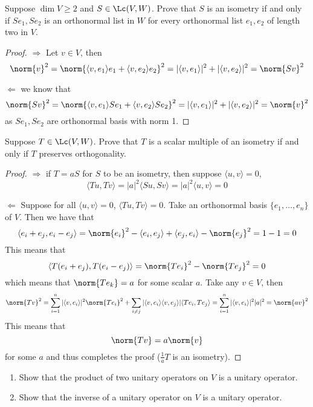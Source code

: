 \documentclass{extarticle}
\begin{document}
\newpage
{}

\begin{problem}{1}
    Suppose \(\dim V \geq 2\) and \(S \in \Lc(V, W)\). Prove that \(S\) is an isometry if
    and only if \(S e_1, S e_2\) is an orthonormal list in \(W\) for every orthonormal
    list \(e_1, e_2\) of length two in \(V\).
\end{problem}

\begin{proof}
\(\Rightarrow\) Let \(v \in V\), then
\[\norm{v}^2 = \norm{\langle v,e_1 \rangle e_1  + \langle v,e_2 \rangle e_2}^2 =  |
\langle v,e_1 \rangle|^2 + |\langle v,e_2 \rangle|^2 = \norm{Sv}^2\]

\(\Leftarrow\) we know that
\[\norm{Sv}^2 = \norm{\langle v,e_1 \rangle Se_1 + \langle v,e_2 \rangle Se_2}^2
= |\langle v,e_1 \rangle|^2 + |\langle v,e_2 \rangle|^2 = \norm{v}^2\]
as \(Se_1, Se_2\) are orthonormal basis with norm 1.
\end{proof}

\begin{problem}{2}
    Suppose \(T \in \Lc(V, W)\). Prove that \(T\) is a scalar multiple of an isometry if and only
    if \(T\) preserves orthogonality.
\end{problem}

\begin{proof}
\(\Rightarrow\) if \(T = aS\) for \(S\) to be an isometry, then suppose \(\langle u,v \rangle = 0\),
\[\langle Tu,Tv\rangle = |a|^2 \langle Su,Sv \rangle = |a|^2 \langle u,v \rangle = 0\]

\(\Leftarrow\) Suppose for all \(\langle u,v \rangle = 0\), \(\langle Tu,Tv \rangle = 0\). Take
an orthonormal basis \(\{e_1, \ldots, e_n\}\) of \(V\). Then we have that
\[\langle e_i + e_j,e_i - e_j \rangle = \norm{e_i}^2 - \langle e_i,e_j \rangle +
\langle e_j,e_i \rangle - \norm{e_j}^2 = 1 - 1 = 0\]
This means that
\[\langle T(e_i + e_j), T(e_i - e_j) \rangle
= \norm{T e_i}^2 - \norm{T e_j}^2 = 0\]
which means that \(\norm{T e_k} = a\) for some scalar \(a\). Take any \(v \in V\), then
\[\norm{Tv}^2 = \sum_{i=1}^{n} |\langle v,e_i \rangle|^2 \norm{T e_i}^2 + \sum_{i \neq j}
|\langle v,e_i \rangle \langle v,e_j \rangle| \langle Te_i,Te_j \rangle
= \sum_{i=1}^{n} |\langle v,e_i \rangle|^2 |a|^2 = \norm{av}^2\]
This means that
\[\norm{Tv} = a \norm{v}\]
for some \(a\) and thus completes the proof (\(\frac{1}{a} T\) is an isometry).
\end{proof}

\begin{problem}{3}
    \begin{enumerate}[label=(\alph*)]
        \item Show that the product of two unitary operators on \(V\) is a unitary operator.
        \item Show that the inverse of a unitary operator on \(V\) is a unitary operator.
    \end{enumerate}
\end{problem}
\end{document}
